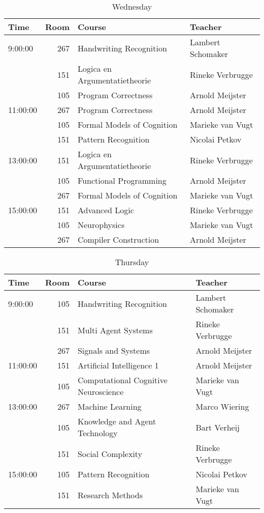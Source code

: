 \begin{table}
    \centering
    \caption{Wednesday}
    \begin{tabular}{l|r|l|l}
        Time & Room & Course & Teacher \\ \hline
        \hline
        9:00:00 & 267 & Handwriting Recognition & Lambert Schomaker\\
        & 151 & Logica en Argumentatietheorie & Rineke Verbrugge\\
        & 105 & Program Correctness & Arnold Meijster\\\hline
        11:00:00 & 267 & Program Correctness & Arnold Meijster\\
        & 105 & Formal Models of Cognition & Marieke van Vugt\\
        & 151 & Pattern Recognition & Nicolai Petkov\\\hline
        13:00:00 & 151 & Logica en Argumentatietheorie & Rineke Verbrugge\\
        & 105 & Functional Programming & Arnold Meijster\\
        & 267 & Formal Models of Cognition & Marieke van Vugt\\\hline
        15:00:00 & 151 & Advanced Logic & Rineke Verbrugge\\
        & 105 & Neurophysics & Marieke van Vugt\\
        & 267 & Compiler Construction & Arnold Meijster\\
    \end{tabular}
\end{table}

\begin{table}
    \centering
    \caption{Thursday}
    \begin{tabular}{l|r|l|l}
        Time & Room & Course & Teacher \\ \hline
        \hline
        9:00:00 & 105 & Handwriting Recognition & Lambert Schomaker\\
        & 151 & Multi Agent Systems & Rineke Verbrugge\\
        & 267 & Signals and Systems & Arnold Meijster\\\hline
        11:00:00 & 151 & Artificial Intelligence 1 & Arnold Meijster\\
        & 105 & Computational Cognitive Neuroscience & Marieke van Vugt\\\hline
        13:00:00 & 267 & Machine Learning & Marco Wiering\\
        & 105 & Knowledge and Agent Technology & Bart Verheij\\
        & 151 & Social Complexity & Rineke Verbrugge\\\hline
        15:00:00 & 105 & Pattern Recognition & Nicolai Petkov\\
        & 151 & Research Methods & Marieke van Vugt\\
    \end{tabular}
\end{table}

